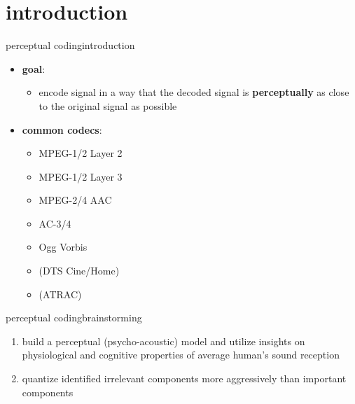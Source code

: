 


\subtitle{Part 26: Perceptual Coding}


	

\section[intro]{introduction}

	\begin{frame}{perceptual coding}{introduction}
        \begin{itemize}
            \item   \textbf{goal}: 
                \begin{itemize}
                    \item   encode signal in a way that the decoded signal is \textbf{perceptually} as close to the original signal as possible
                \end{itemize}
            \pause
            \bigskip
            \item   \textbf{common codecs}:
                \begin{itemize}
                    \item   MPEG-1/2 Layer 2
                    \item   MPEG-1/2 Layer 3
                    \item   %
                    MPEG-2/4 AAC
                    \item   AC-3/4
                    \item   Ogg Vorbis
                    \item   (DTS  Cine/Home)
                    \item   (ATRAC)
                \end{itemize}
        \end{itemize}
	\end{frame}
	\begin{frame}{perceptual coding}{brainstorming}
        
        \begin{enumerate}
            \item   build a perceptual (psycho-acoustic) model and utilize insights on physiological and cognitive properties of average human's sound reception
            \bigskip
            \item   quantize identified irrelevant components more aggressively than important components
        \end{enumerate}
	\end{frame}
